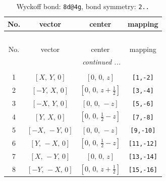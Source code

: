 \documentclass[fleqn,8pt]{jsarticle}
\begin{document}
\begin{longtable}{cccc}
\caption{Wyckoff bond: {\tt 8d@4g}, bond symmetry: {\tt 2..}}
 \\
 \hline \hline
No. & vector & center & mapping \\ \hline \endfirsthead

\multicolumn{3}{l}{\tablename\ \thetable{}} \\
 \hline \hline
No. & vector & center & mapping \\ \hline \endhead

 \hline \hline
\multicolumn{3}{r}{\footnotesize\it continued ...} \\ \endfoot

 \hline \hline
\multicolumn{3}{r}{} \\ \endlastfoot

1 & $\left[ X,\, Y,\, 0 \right]$ & $\left[ 0,\, 0,\, z \right]$ & {\tt [1,-2]} \\ \hline
2 & $\left[ - Y,\, X,\, 0 \right]$ & $\left[ 0,\, 0,\, z + \frac{1}{2} \right]$ & {\tt [3,-4]} \\ \hline
3 & $\left[ - X,\, Y,\, 0 \right]$ & $\left[ 0,\, 0,\, - z \right]$ & {\tt [5,-6]} \\ \hline
4 & $\left[ Y,\, X,\, 0 \right]$ & $\left[ 0,\, 0,\, \frac{1}{2} - z \right]$ & {\tt [7,-8]} \\ \hline
5 & $\left[ - X,\, - Y,\, 0 \right]$ & $\left[ 0,\, 0,\, - z \right]$ & {\tt [9,-10]} \\ \hline
6 & $\left[ Y,\, - X,\, 0 \right]$ & $\left[ 0,\, 0,\, \frac{1}{2} - z \right]$ & {\tt [11,-12]} \\ \hline
7 & $\left[ X,\, - Y,\, 0 \right]$ & $\left[ 0,\, 0,\, z \right]$ & {\tt [13,-14]} \\ \hline
8 & $\left[ - Y,\, - X,\, 0 \right]$ & $\left[ 0,\, 0,\, z + \frac{1}{2} \right]$ & {\tt [15,-16]} \\
\end{longtable}
\renewcommand{\arraystretch}{1.2}
\end{document}
